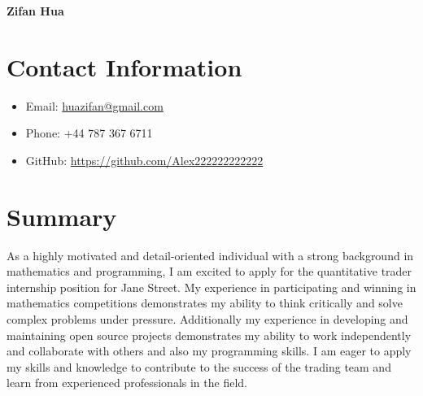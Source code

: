 \documentclass{article}
\begin{document}
\begin{center}
    \textbf{\Large Zifan Hua}
\end{center}

\section*{Contact Information}
\begin{itemize}[leftmargin=*]
    \item Email: \href{mailto:huazifan@gmail.com}{huazifan@gmail.com}
    \item Phone: +44 787 367 6711
    \item GitHub: \href{https://github.com/Alex222222222222}{https://github.com/Alex222222222222}
\end{itemize}

\section*{Summary}
As a highly motivated and detail-oriented individual with a strong background in mathematics and programming, I am excited to apply for the quantitative trader internship position for Jane Street. 
My experience in participating and winning in mathematics competitions demonstrates my ability to think critically and solve complex problems under pressure.
Additionally my experience in developing and maintaining open source projects demonstrates my ability to work independently and collaborate with others and also my programming skills.
I am eager to apply my skills and knowledge to contribute to the success of the trading team and learn from experienced professionals in the field.
\end{document}
